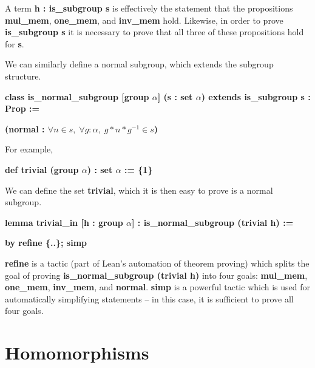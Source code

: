 \documentclass[runningheads,a4paper]{llncs}
\renewcommand{\a}{\alpha}
\renewcommand{\-}{\setminus}
\begin{document}
A term \textbf{h : is\_subgroup s} is effectively the statement that the propositions \textbf{mul\_mem}, \textbf{one\_mem}, and \textbf{inv\_mem} hold. Likewise, in order to prove \textbf{is\_subgroup s} it is necessary to prove that all three of these propositions hold for \textbf{s}.

We can similarly define a normal subgroup, which extends the subgroup structure.

\vspace{2 mm}
\hspace{2 em}\textbf{class is\_normal\_subgroup [group $\a$] (s : set $\a$) extends is\_subgroup s : Prop :=}

\hspace{4 em}\textbf{(normal : $\forall n \in s,\; \forall g : \a,\; g * n * g^{-1} \in s$)}
\vspace{2 mm}

For example, 

\vspace{2 mm}
\hspace{2 em}\textbf{def trivial (group $\a$) : set $\a$ := \{1\}}
\vspace{2 mm}

We can define the set \textbf{trivial}, which it is then easy to prove is a normal subgroup.

\vspace{2 mm}
\hspace{2 em}\textbf{lemma trivial\_in [h : group $\a$] : is\_normal\_subgroup (trivial h) :=}

\hspace{4 em}\textbf{by refine \{..\}; simp}
\vspace{2 mm}

\textbf{refine} is a tactic (part of Lean's automation of theorem proving) which splits the goal of proving \textbf{is\_normal\_subgroup (trivial h)} into four goals: \textbf{mul\_mem}, \textbf{one\_mem}, \textbf{inv\_mem}, and \textbf{normal}. \textbf{simp} is a powerful tactic which is used for automatically simplifying statements -- in this case, it is sufficient to prove all four goals.\\




\section{Homomorphisms}
\end{document}
